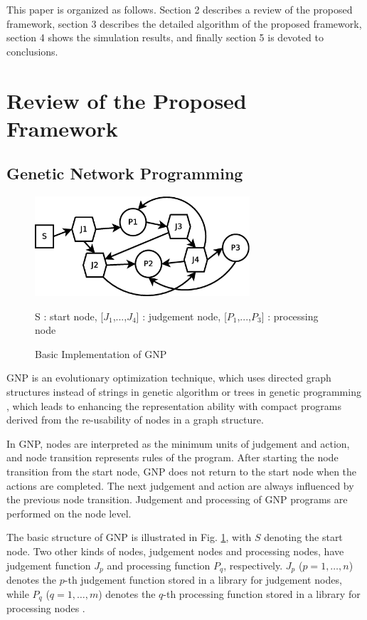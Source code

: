 \documentclass{elsart}
\begin{document}
This paper is organized as follows. Section 2 describes a review of the proposed framework, section 3 describes the detailed algorithm of the proposed framework, section 4 shows the simulation results, and finally section 5 is devoted to conclusions.

\section{Review of the Proposed Framework}

\subsection{Genetic Network Programming}

\begin{figure}[tb]
\begin{center}
\includegraphics[width=8cm]{images/gnpbasic}
\caption{\label{gnpbasic} Basic Implementation of GNP}
\end{center}
S : start node, [$J_{1}$,...,$J_{4}$] : judgement node, [$P_{1}$,...,$P_{3}$] : processing node
\end{figure}

GNP is an evolutionary optimization technique, which uses directed graph structures instead of strings in genetic algorithm \cite{holland1975} or trees in genetic programming \cite{koza1992}, which leads to enhancing the representation ability with compact programs derived from the re-usability of nodes in a graph structure.

In GNP, nodes are interpreted as the minimum units of judgement and action, and node transition represents rules of the program. After starting the node transition from the start node, GNP does not return to the start node when the actions are completed. The next judgement and action are always influenced by the previous node transition. Judgement and processing of GNP programs are performed on the node level.

The basic structure of GNP is illustrated in Fig. \ref{gnpbasic}, with $S$ denoting the start node. Two other kinds of nodes, judgement nodes and processing nodes, have judgement function $J_{p}$ and processing function $P_{q}$, respectively. $J_{p}$ ($p = 1,\dots, n$) denotes the $p$-th judgement function stored in a library for judgement nodes, while $P_{q}$ ($q = 1,\dots, m$) denotes the $q$-th processing function stored in a library for processing nodes \cite{gnp1, gnp2}.
\end{document}
